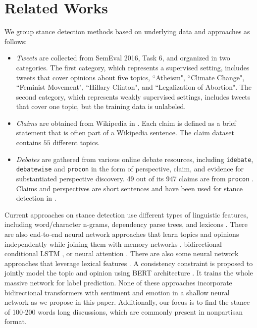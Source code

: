 \documentclass[11pt,a4paper]{article}
\begin{document}
\section{ Related Works}
We group stance detection methods based on underlying data and  approaches as follows:
\begin{itemize}
    \item \textit{Tweets} are collected from SemEval 2016, Task 6, \cite{mohammad-etal-2016-semeval} and organized in two categories.  The first category,
    which represents a supervised setting, includes tweets that cover opinions about five     topics, 
    ``Atheism", ``Climate Change", ``Feminist Movement", ``Hillary Clinton", and ``Legalization of Abortion". The second category, which represents weakly supervised settings, includes tweets that cover one topic, but the training data is unlabeled. 
    \item \textit{Claims} are obtained from Wikipedia in \cite{bar-haim-etal-2017-stance}. Each claim is defined as a brief statement that is often part of a Wikipedia sentence. The claim dataset contains $55$ different topics. 
   \item  \textit{Debates} are gathered from various online debate resources, including \texttt{idebate}, \texttt{debatewise} and \texttt{procon} in the form of perspective, claim, and evidence for substantiated perspective discovery.  49 out of its 947 claims are from \texttt{procon} \cite{chen-etal-2019-seeing}. Claims and perspectives are short sentences and have been used for stance detection in \cite{Popat2019STANCYSC}.
 
\end{itemize}
Current approaches on stance detection use different types of linguistic features, including word/character n-grams, dependency parse trees, and lexicons \cite{sun-etal-2018-stance,sridhar-etal-2015-joint,hasan-ng-2013-stance,walker-etal-2012-stance}.
 There are also end-to-end  neural network approaches that learn topics and opinions independently while joining them with memory networks \cite{mohtarami-etal-2018-automatic},
bidirectional conditional LSTM \cite{augenstein-etal-2016-stance}, or neural attention  \cite{du2017stance}. There are also some neural network approaches that 
leverage lexical features \cite{riedel2017fnc,hanselowski-etal-2018-retrospective}. A consistency constraint is proposed to jointly model the topic and opinion using BERT architecture \cite{Popat2019STANCYSC}. It trains the whole massive network for label prediction.  None of these approaches incorporate bidirectional transformers with sentiment and emotion in a shallow neural network as we propose in this paper. Additionally, our focus is to find the stance of 100-200 words long discussions, which are commonly present in nonpartisan format.
\end{document}
